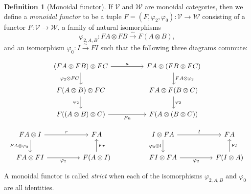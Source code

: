 \documentclass[reqno]{amsart}
\theoremstyle{definition}
\newtheorem{definition}[theorem]{Definition}
\theoremstyle{remark}
\begin{document}
   \begin{definition}[Monoidal functor]
       If $\mathcal{V}$ and $\mathcal{W}$ are monoidal categories,
       then we define a \textit{monoidal functor} to be
       a tuple $F = \left( F , \varphi_2, 
       \varphi_0 \right) \colon
       \mathcal{V} \to \mathcal{W}$ consisting of
       a functor $F \colon \mathcal{V} \to \mathcal{W}$,
       a family of natural isomorphisms
       \[
       \varphi_{2, A, B} \colon
       FA \otimes FB \stackrel{\sim}{\to } F\left( A 
       \otimes B \right) ,
       \] 
       and an isomorphism
       $\varphi_0 \colon I \stackrel{\sim}{\to } FI $ such that
       the following three diagrams commute:

       \[\begin{tikzcd}
	{(FA \otimes FB) \otimes FC} && {FA \otimes (F B \otimes FC)} \\
	{F(A \otimes B) \otimes FC} && {FA \otimes F (B \otimes C)} \\
	{F((A \otimes B) \otimes C)} && {F (A \otimes (B \otimes C))}
	\arrow["a", from=1-1, to=1-3]
	\arrow["{\varphi_2 \otimes FC}"', from=1-1, to=2-1]
	\arrow["{FA \otimes \varphi_2}", from=1-3, to=2-3]
	\arrow["{\varphi_2}"', from=2-1, to=3-1]
	\arrow["{\varphi_2}", from=2-3, to=3-3]
	\arrow["Fa"', from=3-1, to=3-3]
\end{tikzcd}\]


\[\begin{tikzcd}
	{FA \otimes I} && FA && {I \otimes FA} && FA \\
	{FA \otimes FI} && {F(A \otimes I)} && {FI \otimes FA} && {F (I \otimes A)}
	\arrow["r", from=1-1, to=1-3]
	\arrow["{FA \otimes \varphi_0}"', from=1-1, to=2-1]
	\arrow["l", from=1-5, to=1-7]
	\arrow["{\varphi_0 \otimes l}"', from=1-5, to=2-5]
	\arrow["{\varphi_2}"', from=2-1, to=2-3]
	\arrow["Fr"', from=2-3, to=1-3]
	\arrow["{\varphi_2}"', from=2-5, to=2-7]
	\arrow["Fl"', from=2-7, to=1-7]
\end{tikzcd}\]

A monoidal functor is called \textit{strict} when each
of the isomorphisms
$\varphi _{2, A, B}$ and $\varphi_0$ are all identities.

   \end{definition}
\end{document}
